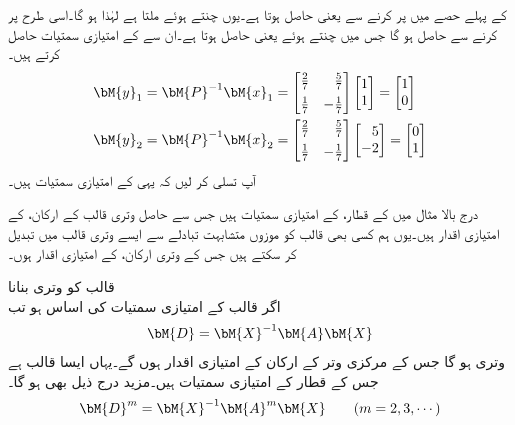  کے پہلے حصے  میں  پر کرنے سے  یعنی  حاصل ہوتا ہے۔یوں  چنتے ہوئے  ملتا ہے لہٰذا  ہو گا۔اسی طرح  پر کرنے سے  حاصل ہو گا جس میں  چنتے ہوئے  یعنی
  حاصل ہوتا ہے۔ان سے  کے امتیازی سمتیات حاصل کرتے ہیں۔
\begin{align*}
\bM{y}_1&=\bM{P}^{-1}\bM{x}_1=\begin{bmatrix*}[r]\tfrac{2}{7}&\tfrac{5}{7}\\[0.5em] \tfrac{1}{7}&-\tfrac{1}{7}  \end{bmatrix*}\begin{bmatrix*}[r]1\\1 \end{bmatrix*}=\begin{bmatrix*}[r]1\\0 \end{bmatrix*}\\
\bM{y}_2&=\bM{P}^{-1}\bM{x}_2=\begin{bmatrix*}[r]\tfrac{2}{7}&\tfrac{5}{7}\\[0.5em] \tfrac{1}{7}&-\tfrac{1}{7}  \end{bmatrix*}\begin{bmatrix*}[r]5\\-2 \end{bmatrix*}=\begin{bmatrix*}[r]0\\1 \end{bmatrix*}
\end{align*}
آپ تسلی کر لیں کہ یہی  کے امتیازی سمتیات ہیں۔

درج بالا  مثال میں  کے قطار،  کے امتیازی سمتیات ہیں جس سے حاصل وتری  قالب  کے ارکان،  کے امتیازی اقدار ہیں۔یوں ہم کسی بھی قالب  کو موزوں متشابہت تبادلے سے ایسے وتری قالب میں تبدیل کر سکتے ہیں جس کے وتری ارکان،  کے امتیازی اقدار ہوں۔  

\quad قالب کو وتری بنانا\\
اگر  قالب  کے امتیازی سمتیات کی اساس ہو تب
\begin{align}\label{مساوات_امتیازی_وتری_حصول_الف}
\bM{D}=\bM{X}^{-1}\bM{A}\bM{X}
\end{align}
وتری ہو گا جس کے مرکزی وتر کے ارکان  کے امتیازی اقدار ہوں گے۔یہاں  ایسا قالب ہے جس کے قطار  کے  امتیازی سمتیات ہیں۔مزید درج ذیل بھی ہو گا۔
\begin{align}\label{مساوات_امتیازی_وتری_حصول_ب}
\bM{D}^m=\bM{X}^{-1}\bM{A}^m\bM{X}\quad \quad (m=2,3,\cdots)
\end{align}

